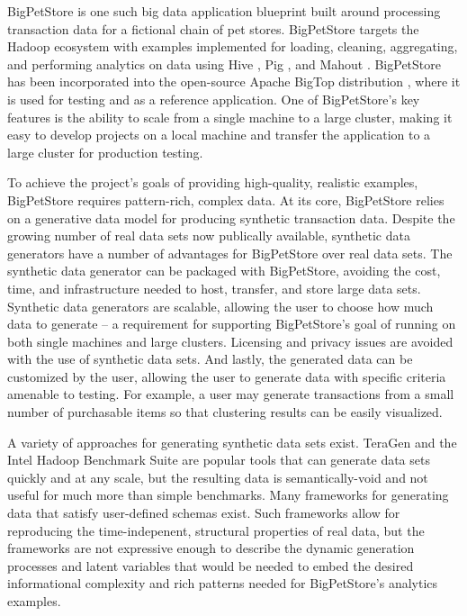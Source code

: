 \documentclass[conference]{IEEEtran}
\begin{document}
BigPetStore is one such big data application blueprint built around processing transaction data for a fictional chain of pet stores.  BigPetStore targets the Hadoop \cite{Hadoop} ecosystem with examples implemented for loading, cleaning, aggregating, and performing analytics on data using Hive \cite{Thusoo2010}, Pig \cite{Olston2008,Gates2009}, and Mahout \cite{Mahout}. BigPetStore has been incorporated into the open-source Apache BigTop distribution \cite{BigTop}, where it is used for testing and as a reference application. One of BigPetStore's key features is the ability to scale from a single machine to a large cluster, making it easy to develop projects on a local machine and transfer the application to a large cluster for production testing.

To achieve the project's goals of providing high-quality, realistic examples, BigPetStore requires pattern-rich, complex data. At its core, BigPetStore relies on a generative data model for producing synthetic transaction data. Despite the growing number of real data sets now publically available, synthetic data generators have a number of advantages for BigPetStore over real data sets. The synthetic data generator can be packaged with BigPetStore, avoiding the cost, time, and infrastructure needed to host, transfer, and store large data sets. Synthetic data generators are scalable, allowing the user to choose how much data to generate -- a requirement for supporting BigPetStore's goal of running on both single machines and large clusters.  Licensing and privacy issues are avoided with the use of synthetic data sets. And lastly, the generated data can be customized by the user, allowing the user to generate data with specific criteria amenable to testing.  For example, a user may generate transactions from a small number of purchasable items so that clustering results can be easily visualized.

A variety of approaches for generating synthetic data sets exist.  TeraGen and the Intel Hadoop Benchmark Suite \cite{Huang2010} are popular tools that can generate data sets quickly and at any scale, but the resulting data is semantically-void and not useful for much more than simple benchmarks.  Many frameworks \cite{Ghazal2013,Rabl2011a,Frank2012,Rabl2011,Gray1994,Bruno2005,Hoag2007,LogSynth,Alexandrov2012,Alexandrov2013,Arasu2011} for generating data that satisfy user-defined schemas exist.  Such frameworks allow for reproducing the time-indepenent, structural properties of real data, but the frameworks are not expressive enough to describe the dynamic generation processes and latent variables that would be needed to embed the desired informational complexity and rich patterns needed for BigPetStore's analytics examples. 
\end{document}
